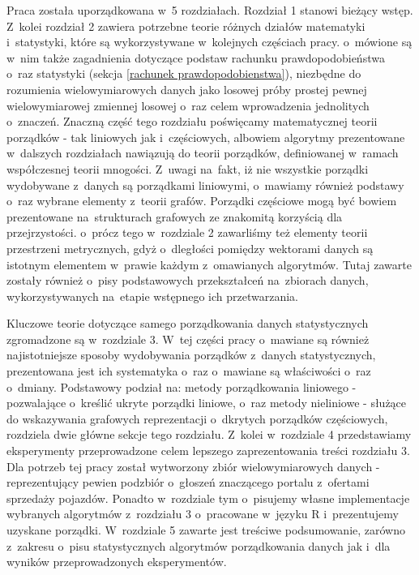\documentclass[12pt,a4paper]{report}
\begin{document}
Praca została uporządkowana w~5 rozdziałach. Rozdział 1 stanowi bieżący wstęp. Z~kolei rozdział 2 zawiera potrzebne teorie różnych działów matematyki i~statystyki, które są wykorzystywane w~kolejnych częściach pracy. o~mówione są w~nim także zagadnienia dotyczące podstaw rachunku prawdopodobieństwa o~raz statystyki (sekcja \ref{rachunek prawdopodobienstwa}), niezbędne do rozumienia wielowymiarowych danych jako losowej próby prostej pewnej wielowymiarowej zmiennej losowej o~raz celem wprowadzenia jednolitych o~znaczeń. Znaczną część tego rozdziału poświęcamy matematycznej teorii porządków - tak liniowych jak i~częściowych, albowiem algorytmy prezentowane w~dalszych rozdziałach nawiązują do teorii porządków, definiowanej w~ramach współczesnej teorii mnogości. Z~uwagi na~fakt, iż nie wszystkie porządki wydobywane z~danych są porządkami liniowymi, o~mawiamy również podstawy o~raz wybrane elementy z~teorii grafów. Porządki częściowe mogą być bowiem prezentowane na~strukturach grafowych ze znakomitą korzyścią dla przejrzystości. o~prócz tego w~rozdziale 2 zawarliśmy też elementy teorii przestrzeni metrycznych, gdyż o~dległości pomiędzy wektorami danych są istotnym elementem w~prawie każdym z~omawianych algorytmów. Tutaj zawarte zostały również o~pisy podstawowych przekształceń na~zbiorach danych, wykorzystywanych na~etapie wstępnego ich przetwarzania.

Kluczowe teorie dotyczące samego porządkowania danych statystycznych zgromadzone są w~rozdziale 3. W~tej części pracy o~mawiane są również najistotniejsze sposoby wydobywania porządków z~danych statystycznych, prezentowana jest ich systematyka o~raz o~mawiane są właściwości o~raz o~dmiany. Podstawowy podział na: metody porządkowania liniowego - pozwalające o~kreślić ukryte porządki liniowe, o~raz metody nieliniowe - służące do wskazywania grafowych reprezentacji o~dkrytych porządków częściowych, rozdziela dwie główne sekcje tego rozdziału. Z~kolei w~rozdziale 4 przedstawiamy eksperymenty przeprowadzone celem lepszego zaprezentowania treści rozdziału 3. Dla potrzeb tej pracy został wytworzony zbiór wielowymiarowych danych - reprezentujący pewien podzbiór o~głoszeń znaczącego portalu z~ofertami sprzedaży pojazdów. Ponadto w~rozdziale tym o~pisujemy własne implementacje wybranych algorytmów z~rozdziału 3 o~pracowane w~języku R i~prezentujemy uzyskane porządki. W~rozdziale 5 zawarte jest treściwe podsumowanie, zarówno z~zakresu o~pisu statystycznych algorytmów porządkowania danych jak i~dla wyników przeprowadzonych eksperymentów.
\end{document}
